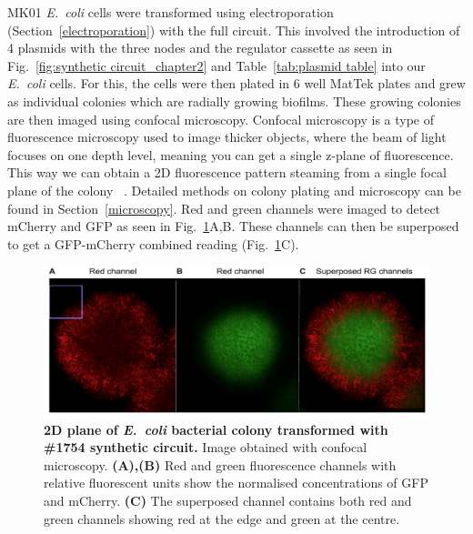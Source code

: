 MK01 \textit{E.~coli} cells were transformed using electroporation (Section~\ref{electroporation}) with the full circuit.
This involved the introduction of 4 plasmids with the three nodes and the regulator cassette as seen in Fig.~\ref{fig:synthetic circuit_chapter2} and Table~\ref{tab:plasmid table} into our \textit{E.~coli} cells.
For this, the cells were then plated in 6 well MatTek plates and grew as individual colonies which are radially growing biofilms.
These growing colonies are then imaged using confocal microscopy.
Confocal microscopy is a type of fluorescence microscopy used to image thicker objects, where the beam of light focuses on one depth level, meaning you can get a single z-plane of fluorescence.
This way we can obtain a 2D fluorescence pattern steaming from a single focal plane of the colony ~\parencite{semwogerere2005confocal}.
 Detailed methods on colony plating and microscopy can be found in Section~\ref{microscopy}.
Red and green channels were imaged to detect mCherry and GFP as seen in Fig.~\ref{rgchannels}A,B.
These channels can then be superposed to get a GFP-mCherry combined reading (Fig.~\ref{rgchannels}C).
\begin{figure}[H]

    \includegraphics[width=1\textwidth]{chapters/Chapter 3/rgchannels}
    \caption{\textbf{2D plane of \textit{E.~coli} bacterial colony transformed with \#1754 synthetic circuit.} Image obtained with confocal microscopy. \textbf{(A),(B)} Red and green fluorescence channels with relative fluorescent units show the normalised concentrations of GFP and mCherry. \textbf{(C)} The superposed channel contains both red and green channels showing red at the edge and green at the centre.}
    \label{rgchannels}
\end{figure}

